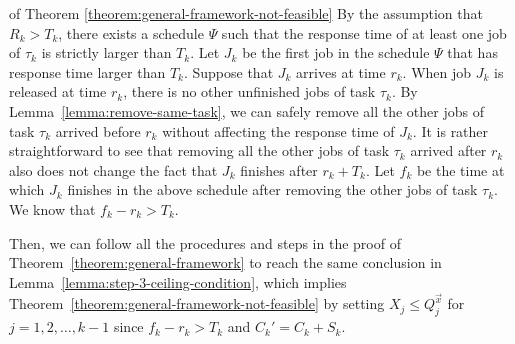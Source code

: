 \begin{appProof}{of Theorem \ref{theorem:general-framework-not-feasible}}
  By the assumption that $R_k > T_k$, there exists a schedule $\Psi$
  such that the response time of at least one job of $\tau_k$ is strictly larger than
  $T_k$. Let $J_k$ be the first job in the schedule $\Psi$ that has
  response time larger than $T_k$. Suppose that $J_{k}$ arrives at
  time $r_k$. When job $J_k$ is released at time $r_k$, there is no
  other unfinished jobs of task $\tau_k$. By
  Lemma~\ref{lemma:remove-same-task}, we can safely remove all the
  other jobs of task $\tau_k$ arrived before $r_k$ without affecting
  the response time of $J_k$. It is rather straightforward to see that
  removing all the other jobs of task $\tau_k$ arrived after $r_k$
  also does not change the fact that $J_k$ finishes after
  $r_k+T_k$. Let $f_k$ be the time at which $J_k$ finishes in the
  above schedule after removing the other jobs of task $\tau_k$. We
  know that $f_k - r_k > T_k$.

  Then, we can follow all the procedures and steps in the proof of
  Theorem~\ref{theorem:general-framework} to reach the same conclusion
  in Lemma~\ref{lemma:step-3-ceiling-condition}, which implies
  Theorem~\ref{theorem:general-framework-not-feasible} by setting $X_j
  \leq Q_j^{\vec{x}}$ for $j=1,2,\ldots,k-1$ since $f_k-r_k > T_k$ and
  $C_k'=C_k+S_k$.
\end{appProof}




